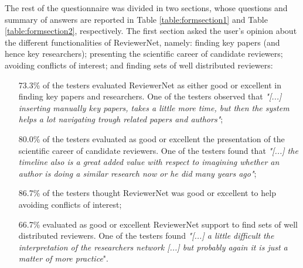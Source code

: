 The rest of the questionnaire was divided in two sections, whose questions and summary of answers are reported in Table \ref{table:formsection1} and Table \ref{table:formsection2}, respectively. The first section asked the user's opinion about the different functionalities of ReviewerNet, namely: finding key papers (and hence key researchers); presenting the scientific career of candidate reviewers; avoiding conflicts of interest; and finding sets of well distributed reviewers:%
\begin{itemize}
\item [73.3\%] of the testers evaluated ReviewerNet as either good or excellent in finding key papers and researchers. One of the testers observed that {\em "[...] inserting manually key papers, takes a little more time, but then the system helps a lot navigating trough related papers and authors"};
\item [80.0\%] of the testers evaluated as good or excellent the presentation of the scientific career of candidate reviewers. One of the testers found that {\em "[...] the timeline also is a great added value with respect to imagining whether an author is doing a similar research now or he did many years ago"};
\item [ 86.7\%] of the testers thought ReviewerNet was good or excellent to help avoiding conflicts of interest; 
\item [ 66.7\%] evaluated as good or excellent ReviewerNet support to find sets of well distributed reviewers. One of the testers found  {\em "[...] a little difficult the interpretation of the researchers network  %
[...] but probably again it is just a matter of more practice}".
\end{itemize}

